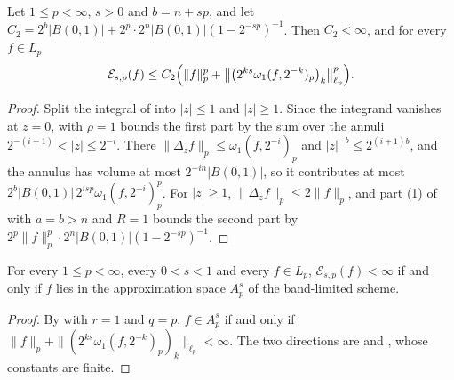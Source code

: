 \begin{theorem}
\label{thm:slobodeckij-form-by-modulus}
\leanok
{}
Let $1 \leq p < \infty$, $s > 0$ and $b = n + sp$, and let
$C_2 = 2^b |B(0, 1)| + 2^p \cdot 2^n |B(0, 1)| (1 - 2^{-sp})^{-1}$. Then $C_2 < \infty$, and for
every $f \in L_p$
\[
  \mathcal{E}_{s,p}(f) \leq C_2 \Bigl( \|f\|_p^p
  + \bigl\| \bigl(2^{ks} \omega_1(f, 2^{-k})_p\bigr)_k \bigr\|_{\ell_p}^p \Bigr) .
\]
\end{theorem}

\begin{proof}
\leanok
Split the integral of  into $|z| \leq 1$ and $|z| \geq 1$. Since
the integrand vanishes at $z = 0$,  with $\rho = 1$ bounds the first
part by the sum over the annuli $2^{-(i+1)} < |z| \leq 2^{-i}$. There
$\|\Delta_z f\|_p \leq \omega_1(f, 2^{-i})_p$ and $|z|^{-b} \leq 2^{(i+1) b}$, and the annulus
has volume at most $2^{-in} |B(0, 1)|$, so it contributes at most
$2^b |B(0, 1)| \, 2^{isp} \omega_1(f, 2^{-i})_p^p$. For $|z| \geq 1$,
$\|\Delta_z f\|_p \leq 2 \|f\|_p$, and part (1) of  with
$a = b > n$ and $R = 1$ bounds the second part by
$2^p \|f\|_p^p \cdot 2^n |B(0, 1)| (1 - 2^{-sp})^{-1}$.
\end{proof}

\begin{theorem}
\label{thm:sobolev-slobodeckij-besov}
\leanok
{}
For every $1 \leq p < \infty$, every $0 < s < 1$ and every $f \in L_p$,
$\mathcal{E}_{s,p}(f) < \infty$ if and only if $f$ lies in the approximation space $A^s_p$ of
the band-limited scheme.
\end{theorem}

\begin{proof}
\leanok
By  with $r = 1$ and $q = p$, $f \in A^s_p$ if and only if
$\|f\|_p + \|(2^{ks} \omega_1(f, 2^{-k})_p)_k\|_{\ell_p} < \infty$. The two directions are
 and , whose
constants are finite.
\end{proof}

